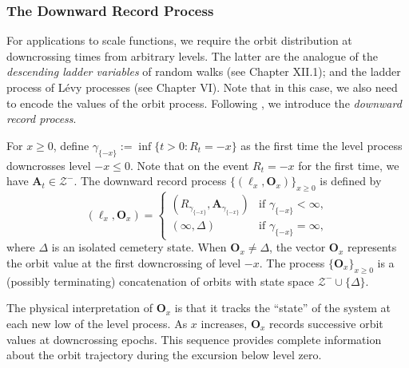 \documentclass[a4paper,11pt]{article}
\numberwithin{equation}{section}
\theoremstyle{plain}
\theoremstyle{definition}
\newcommand{\1}{\mathbf{1}}
\begin{document}
\subsubsection{The Downward Record Process}

For applications to scale functions, we require the orbit distribution at downcrossing times from arbitrary levels. The latter are the analogue of the \emph{descending ladder variables} of random walks (see \cite{MR0270403} Chapter XII.1); and the ladder process of L\'evy processes (see \cite{MR1406564} Chapter VI). Note that in this case, we also need to encode the values of the orbit process. 
Following \cite[Section 4.2]{BeanNguyenNielsenPeralta2022}, we introduce the \emph{downward record process}.

For $x \ge 0$, define $\gamma_{\{-x\}} := \inf\{t>0 : R_t=-x\}$ as the first time the level process downcrosses level $-x \le 0$. 
Note that on the event $R_t=-x$ for the first time, we have $\bm{A}_t\in\mathcal{Z}^-$. 
The downward record process $\{(\ell_x, \bm{O}_x)\}_{x \ge 0}$ is defined by
\begin{equation}\label{eq:downward_record}
(\ell_x, \bm{O}_x) = \begin{cases}
(R_{\gamma_{\{-x\}}}, \bm{A}_{\gamma_{\{-x\}}}) & \text{if } \gamma_{\{-x\}} < \infty, \\
(\infty, \Delta) & \text{if } \gamma_{\{-x\}} = \infty,
\end{cases}
\end{equation}
where $\Delta$ is an isolated cemetery state. When $\bm{O}_x \neq \Delta$, the vector $\bm{O}_x$ represents the orbit value at the first downcrossing of level $-x$. The process $\{\bm{O}_x\}_{x \ge 0}$ is a (possibly terminating) concatenation of orbits with state space $\mathcal{Z}^- \cup \{\Delta\}$.

The physical interpretation of $\bm{O}_x$ is that it tracks the ``state'' of the system at each new low of the level process. As $x$ increases, $\bm{O}_x$ records successive orbit values at downcrossing epochs. This sequence provides complete information about the orbit trajectory during the excursion below level zero.
\end{document}
